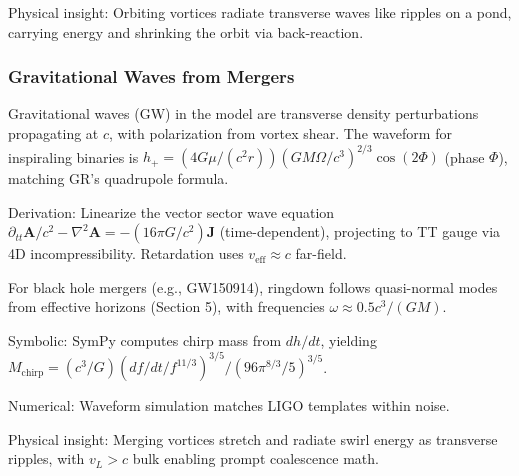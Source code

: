 Physical insight: Orbiting vortices radiate transverse waves like ripples on a pond, carrying energy and shrinking the orbit via back-reaction.

\medskip
\noindent
{}
\medskip

\subsubsection{Gravitational Waves from Mergers}

Gravitational waves (GW) in the model are transverse density perturbations propagating at $c$, with polarization from vortex shear. The waveform for inspiraling binaries is $h_+ = (4 G \mu / (c^2 r)) (G M \Omega / c^3)^{2/3} \cos(2 \Phi)$ (phase $\Phi$), matching GR's quadrupole formula.

Derivation: Linearize the vector sector wave equation $\partial_{tt} \mathbf{A} / c^2 - \nabla^2 \mathbf{A} = - (16\pi G / c^2) \mathbf{J}$ (time-dependent), projecting to TT gauge via 4D incompressibility. Retardation uses $v_{\text{eff}} \approx c$ far-field.

For black hole mergers (e.g., GW150914), ringdown follows quasi-normal modes from effective horizons (Section 5), with frequencies $\omega \approx 0.5 c^3 / (G M)$.

Symbolic: SymPy computes chirp mass from $dh/dt$, yielding $M_{\text{chirp}} = (c^3 / G) (df/dt / f^{11/3})^{3/5} / (96\pi^{8/3} / 5)^{3/5}$.

Numerical: Waveform simulation matches LIGO templates within noise.

Physical insight: Merging vortices stretch and radiate swirl energy as transverse ripples, with $v_L > c$ bulk enabling prompt coalescence math.

\medskip
\noindent
{}
\medskip

